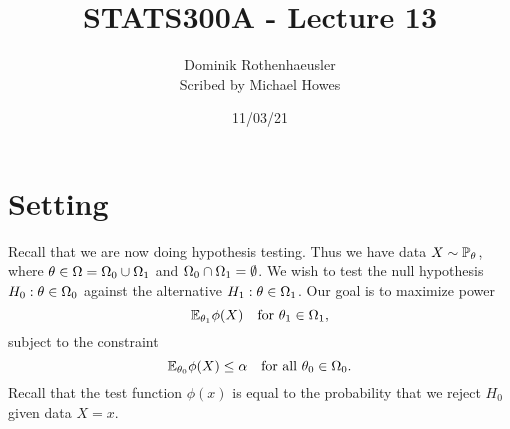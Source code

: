




\title{STATS300A - Lecture 13}
\author{Dominik Rothenhaeusler\\ Scribed by Michael Howes}
\date{11/03/21}

\pagestyle{fancy}
\fancyhf{}


\maketitle
\tableofcontents
\section{Setting}
Recall that we are now doing hypothesis testing. Thus we have data $X \sim {\mathbb{P}}_{\theta}$, where ${\theta} \in {{\Omega}} = {{\Omega}}_0 \cup {{\Omega}}_1$ and ${{\Omega}}_0 \cap {{\Omega}}_1 = \emptyset$. We wish to test the null hypothesis $H_0 : {\theta} \in {{\Omega}}_0$ against the alternative $H_1 : {\theta} \in {{\Omega}}_1$. Our goal is to maximize power
\[{\mathbb{E}}_{{\theta}_1}\phi(X)~~\text{ for } {\theta}_1 \in {{\Omega}}_1, \]
subject to the constraint
\[{\mathbb{E}}_{{\theta}_0}\phi(X) \le {\alpha} ~~\text{ for all }{\theta}_0\in{{\Omega}}_0. \]
Recall that the test function $\phi(x)$ is equal to the probability that we reject $H_0$ given data $X=x$.
